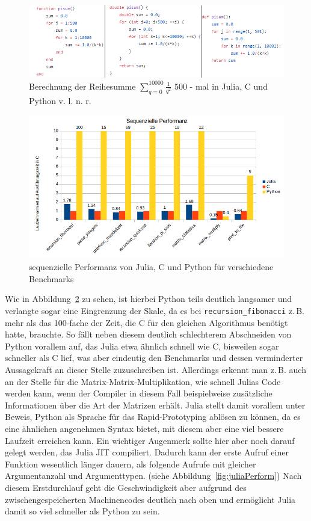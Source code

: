 \documentclass[proseminar,german,utf8]{zihpub}
\newcommand{\zB}[0]{{z.\,B. }}
\begin{document}
\begin{figure}[hbt!]
  \centering
  \includegraphics[scale=2.5]{bilder/pisum.png}
  \caption{Berechnung der Reihesumme $\sum_{q=0}^{10000} \frac{1}{q^{2}}$ 500 - mal in Julia, C und Python v. l. n. r. }
  \label{fig:pisum}
\end{figure}

\begin{figure}[hbt!]
  \centering
  \includegraphics[scale=0.8]{bilder/sequenziell_performance.png}
  \caption{sequenzielle Performanz von Julia, C und Python für verschiedene Benchmarks}
  \label{fig:sequPerform}
\end{figure}

Wie in Abbildung~\ref{fig:sequPerform} zu sehen, ist hierbei Python teils deutlich langsamer und verlangte sogar eine Eingrenzung der Skale, da es bei \verb|recursion_fibonacci| \zB mehr als das 100-fache der Zeit, die C für den gleichen Algorithmus benötigt hatte, brauchte. So fällt neben diesem deutlich schlechterem Abschneiden von Python vorallem auf, das Julia etwa ähnlich schnell wie C,  bisweilen sogar schneller als C lief, was aber eindeutig den Benchmarks und dessen verminderter Aussagekraft an dieser Stelle zuzuschreiben ist. Allerdings erkennt man \zB auch an der Stelle für die Matrix-Matrix-Multiplikation, wie schnell Julias Code werden kann, wenn der Compiler in diesem Fall beispielweise zusätzliche Informationen über die Art der Matrizen erhält. Julia stellt damit vorallem unter Beweis, Python als Sprache für das Rapid-Prototyping ablösen zu können, da es eine ähnlichen angenehmen Syntax bietet, mit diesem aber eine viel bessere Laufzeit erreichen kann. Ein wichtiger Augenmerk sollte hier aber noch darauf gelegt werden, das Julia JIT compiliert. Dadurch kann der erste Aufruf einer Funktion wesentlich länger dauern, als folgende Aufrufe mit gleicher Argumentanzahl und Argumenttypen. (siehe Abbildung~\ref{fig:juliaPerform}) Nach diesem Erstdurchlauf geht die Geschwindigkeit aber aufgrund des zwischengespeicherten Machinencodes deutlich nach oben und ermöglicht Julia damit so viel schneller als Python zu sein.
\end{document}
